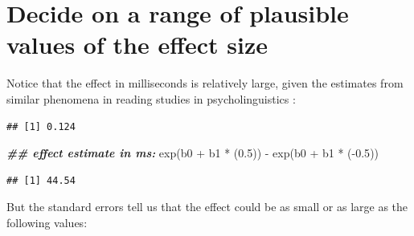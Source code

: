 \documentclass[
  12pt,
]{krantz}
\newenvironment{Shaded}{\begin{snugshade}}{\end{snugshade}}
\newcommand{\DecValTok}[1]{\textcolor[rgb]{0.00,0.00,0.81}{#1}}
\newcommand{\DocumentationTok}[1]{\textcolor[rgb]{0.56,0.35,0.01}{\textbf{\textit{#1}}}}
\newcommand{\FloatTok}[1]{\textcolor[rgb]{0.00,0.00,0.81}{#1}}
\newcommand{\FunctionTok}[1]{\textcolor[rgb]{0.00,0.00,0.00}{#1}}
\newcommand{\NormalTok}[1]{#1}
\newcommand{\OtherTok}[1]{\textcolor[rgb]{0.56,0.35,0.01}{#1}}
\newcommand{\SpecialCharTok}[1]{\textcolor[rgb]{0.00,0.00,0.00}{#1}}
\theoremstyle{definition}
\theoremstyle{definition}
\theoremstyle{definition}
\theoremstyle{definition}
\theoremstyle{remark}
\begin{document}
\hypertarget{decide-on-a-range-of-plausible-values-of-the-effect-size}{%
\section{Decide on a range of plausible values of the effect size}\label{decide-on-a-range-of-plausible-values-of-the-effect-size}}

Notice that the effect in milliseconds is relatively large, given the estimates from similar phenomena in reading studies in psycholinguistics \citep{JaegerEngelmannVasishth2017}:

\begin{Shaded}
\end{Shaded}

\begin{verbatim}
## [1] 0.124
\end{verbatim}

\begin{Shaded}
\begin{Highlighting}[]
\DocumentationTok{\#\# effect estimate in ms:}
\FunctionTok{exp}\NormalTok{(b0 }\SpecialCharTok{+}\NormalTok{ b1 }\SpecialCharTok{*}\NormalTok{ (}\FloatTok{0.5}\NormalTok{)) }\SpecialCharTok{{-}} \FunctionTok{exp}\NormalTok{(b0 }\SpecialCharTok{+}\NormalTok{ b1 }\SpecialCharTok{*}\NormalTok{ (}\SpecialCharTok{{-}}\FloatTok{0.5}\NormalTok{))}
\end{Highlighting}
\end{Shaded}

\begin{verbatim}
## [1] 44.54
\end{verbatim}

But the standard errors tell us that the effect could be as small or as large as the following values:

\begin{Shaded}
\end{Shaded}
\end{document}
